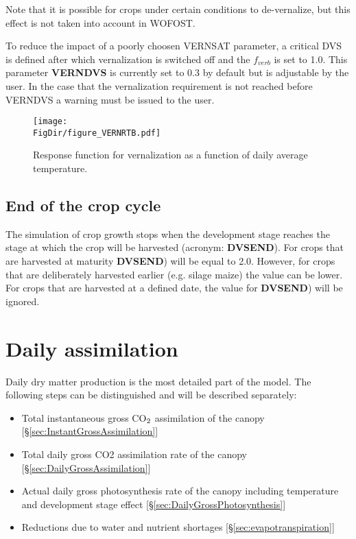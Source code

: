 Note that it is possible for crops under certain conditions to de-vernalize, but this effect is not taken
into account in WOFOST.

To reduce the impact of a poorly choosen VERNSAT parameter, a critical DVS is defined after which 
vernalization is switched off and the $f_{verb}$ is set to 1.0. This parameter \textbf{VERNDVS}
is currently set to 0.3 by default but is adjustable by the user. In the case that the vernalization
requirement is not reached before VERNDVS a warning must be issued to the user.

\begin{figure}[p]
	\centering
	\texttt{[image: \\FigDir/figure\_VERNRTB.pdf]}
	\caption{Response function for vernalization as a function
	of daily average temperature.} 
	\label{fig:VERNRTB}
\end{figure}

\subsection{End of the crop cycle}

The simulation of crop growth stops when the development stage reaches the stage at
which the crop will be harvested (acronym: {\bf DVSEND}). For crops that are harvested
at maturity {\bf DVSEND}) will be equal to 2.0. However, for crops that are deliberately
harvested earlier (e.g. silage maize) the value can be lower. For crops that are harvested
at a defined date, the value for {\bf DVSEND}) will be ignored.

\section{Daily assimilation} 

Daily dry matter production is the most detailed part of the model. The following steps
can be distinguished and will be described separately:
\begin{itemize}
	\item Total instantaneous gross CO$_{{\rm 2}}$ assimilation of the canopy 
	[\S \ref{sec:InstantGrossAssimilation}]
	\item Total daily gross CO2 assimilation rate of the canopy 
    [\S \ref{sec:DailyGrossAssimilation}]
	\item Actual daily gross photosynthesis rate of the canopy
	including temperature and development stage effect
    [\S \ref{sec:DailyGrossPhotosynthesis}]
	\item Reductions due to water and nutrient shortages
    [\S \ref{sec:evapotranspiration}]
\end{itemize}


